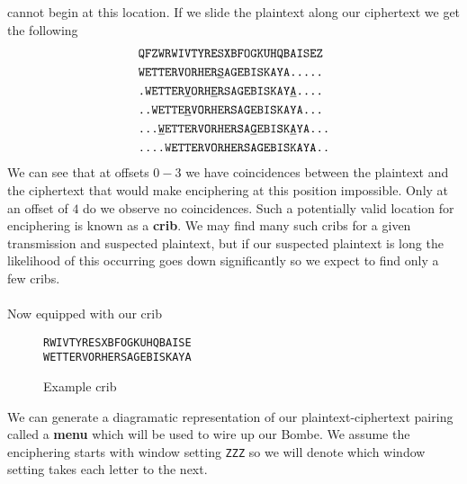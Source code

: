 cannot begin at this location. If we slide the plaintext along our
ciphertext we get the following
\begin{align*}
	 & \texttt{QFZWRWIVTYRESXBFOGKUHQBAISEZ}
	\\
	 & \texttt{WETTERVORHER}{\uline{\texttt{S}}}\texttt{AGEBISKAYA.....}
	\\
	 &
	\texttt{.WETTER}{\uline{\texttt{V}}}\texttt{ORH}{\uline{\texttt{E}}}\texttt{RSAGEBISKAY}{\uline{\texttt{A}}}\texttt{....}
	\\
	 & \texttt{..WETTE}{\uline{\texttt{R}}}\texttt{VORHERSAGEBISKAYA...}
	\\
	 &
	\texttt{...}{\uline{\texttt{W}}}\texttt{ETTERVORHERSA}{\uline{\texttt{G}}}\texttt{EBISK}{\uline{\texttt{A}}}\texttt{YA...}
	\\
	 & \texttt{....WETTERVORHERSAGEBISKAYA..}
	\\
\end{align*}
We can see that at offsets $0-3$ we have coincidences between the
plaintext and the ciphertext that would make enciphering at this
position impossible. Only at an offset of $4$ do we observe no
coincidences. Such a potentially valid location for enciphering is
known as a {\bf{crib}}. We may find many such cribs for a given
transmission and suspected plaintext, but if our suspected plaintext
is long the likelihood of this occurring goes down significantly so
we expect to find only a few cribs.
\\\\Now equipped with our crib
\begin{figure}[H]
	\begin{center}
		\texttt{RWIVTYRESXBFOGKUHQBAISE}  \\
		\texttt{WETTERVORHERSAGEBISKAYA} \\
	\end{center}
	\caption{Example crib}
	\label{fig:crib}
\end{figure}
\noindent We can generate a diagramatic representation of our
plaintext-ciphertext pairing called a {\bf{menu}} which will be used
to wire up our Bombe. We assume the enciphering starts with window
setting \texttt{ZZZ} so we will denote which window setting takes
each letter to the next.
